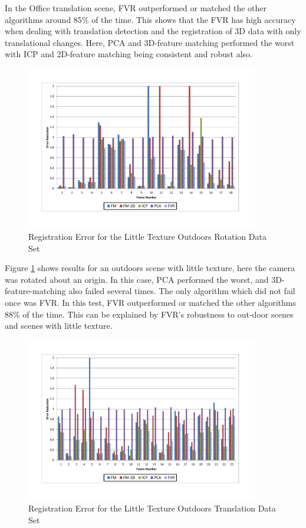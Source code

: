 In the Office translation scene, FVR outperformed or matched the other algorithms around 85\% of the time. This shows that the FVR has high accuracy when dealing with translation detection and the registration of 3D data with only translational changes. Here, PCA and 3D-feature matching performed the worst with ICP and 2D-feature matching being consistent and robust also. \\

\begin{figure}[!htb]
\centering
\includegraphics[width=4.0in]{images/results/Outside_No_Texture_Rotation}
\caption{Registration Error for the Little Texture Outdoors Rotation Data Set}
\label{fig:PET13}
\end{figure}

Figure \ref{fig:PET13} shows results for an outdoors scene with little texture, here the camera was rotated about an origin. In this case, PCA performed the worst, and 3D-feature-matching also failed several times. The only algorithm which did not fail once was FVR. In this test, FVR outperformed or matched the other algorithms 88\% of the time. This can be explained by FVR's robustness to out-door scenes and scenes with little texture.  \\

\begin{figure}[!htb]
\centering
\includegraphics[width=4.0in]{images/results/Outside_No_Texture_Translation}
\caption{Registration Error for the Little Texture Outdoors Translation Data Set}
\label{fig:PET14}
\end{figure}

